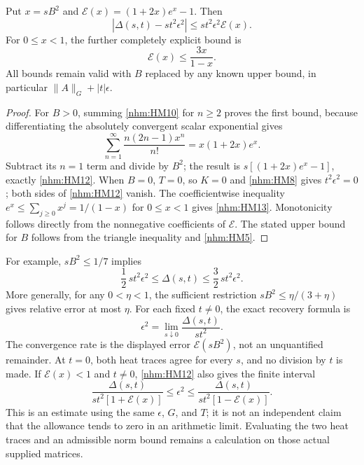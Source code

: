 \begin{nhmtheorem}
Put \(x=sB^2\) and \(\mathcal E(x)=(1+2x)e^x-1\). Then
\begin{equation}
 \left|\Delta(s,t)-s t^2\epsilon^2\right|
 \le s t^2\epsilon^2\mathcal E(x).
 \tag{HM12}\label{nhm:HM12}
\end{equation}
For \(0\le x<1\), the further completely explicit bound is
\begin{equation}
 \mathcal E(x)\le\frac{3x}{1-x}.
 \tag{HM13}\label{nhm:HM13}
\end{equation}
All bounds remain valid with \(B\) replaced by any known upper bound, in
particular \(\|A\|_G+|t|\epsilon\).
\end{nhmtheorem}
\begin{proof}
For \(B>0\), summing \eqref{nhm:HM10} for \(n\ge2\) proves the first bound,
because differentiating the absolutely convergent scalar exponential gives
\[
 \sum_{n=1}^{\infty}\frac{n(2n-1)x^n}{n!}
   =x(1+2x)e^x.
\]
Subtract its \(n=1\) term and divide by \(B^2\); the result is
\(s[(1+2x)e^x-1]\), exactly \eqref{nhm:HM12}.
When \(B=0\), \(T=0\), so \(K=0\) and \eqref{nhm:HM8} gives
\(t^2\epsilon^2=0\); both sides of \eqref{nhm:HM12} vanish.
The coefficientwise inequality \(e^x\le\sum_{j\ge0}x^j=1/(1-x)\)
for \(0\le x<1\) gives \eqref{nhm:HM13}. Monotonicity follows directly from
the nonnegative coefficients of \(\mathcal E\). The stated upper bound
for \(B\) follows from the triangle inequality and \eqref{nhm:HM5}.
\end{proof}

For example, \(sB^2\le1/7\) implies
\begin{equation}
 \frac12\,s t^2\epsilon^2\le\Delta(s,t)
       \le\frac32\,s t^2\epsilon^2.
 \tag{HM14}\label{nhm:HM14}
\end{equation}
More generally, for any \(0<\eta<1\), the sufficient restriction
\(sB^2\le\eta/(3+\eta)\) gives relative error at most \(\eta\).
For each fixed \(t\ne0\), the exact recovery formula is
\begin{equation}
 \epsilon^2=\lim_{s\downarrow0}\frac{\Delta(s,t)}{s t^2}.
 \tag{HM15}\label{nhm:HM15}
\end{equation}
The convergence rate is the displayed error \(\mathcal E(sB^2)\), not an
unquantified remainder. At \(t=0\), both heat traces agree for every \(s\),
and no division by \(t\) is made. If \(\mathcal E(x)<1\) and \(t\ne0\),
\eqref{nhm:HM12} also gives the finite interval
\begin{equation}
 \frac{\Delta(s,t)}{s t^2[1+\mathcal E(x)]}
 \le\epsilon^2\le
 \frac{\Delta(s,t)}{s t^2[1-\mathcal E(x)]}.
 \tag{HM16}\label{nhm:HM16}
\end{equation}
This is an estimate using the same \(\epsilon\), \(G\), and \(T\); it is
not an independent claim that the allowance tends to zero in an arithmetic
limit. Evaluating the two heat traces and an admissible norm bound remains
a calculation on those actual supplied matrices.

